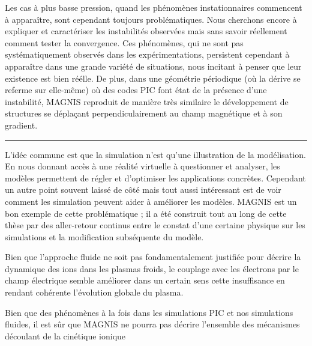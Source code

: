 Les cas à plus basse pression, quand les phénomènes instationnaires
commencent à apparaître, sont cependant toujours problématiques. Nous
cherchons encore à expliquer et caractériser les instabilités observées mais
sans savoir réellement comment tester la convergence. Ces phénomènes, qui ne
sont pas systématiquement observés dans les expérimentations, 
persistent cependant à apparaître dans une grande variété de situations, nous
incitant à penser que leur existence est bien réélle. De plus, dans une
géométrie périodique (où la dérive se referme sur elle-même) où des codes PIC
font état de la présence d'une instabilité, MAGNIS reproduit de manière très similaire 
le développement de structures se déplaçant perpendiculairement au champ
magnétique et à son gradient.

\begin{center}
\rule{0.6\textwidth}{1pt}
\end{center}

L'idée commune est que la simulation n'est qu'une illustration de la
modélisation. En nous donnant accès à une réalité virtuelle à questionner et
analyser, les modèles permettent de régler et d'optimiser les applications
concrètes. Cependant un autre point souvent laissé de côté mais tout aussi
intéressant est de voir comment les simulation peuvent aider à améliorer les
modèles. MAGNIS est un bon exemple de cette problématique ; il a été construit
tout au long de cette thèse par des aller-retour continus entre le constat d'une
certaine physique sur les simulations et la modification subséquente du modèle.


Bien que
l'approche fluide ne soit pas fondamentalement justifiée pour décrire la
dynamique des ions dans les plasmas froids, le couplage avec les électrons par
le champ électrique semble améliorer dans un certain sens cette insuffisance en
rendant cohérente l'évolution globale du plasma.

Bien que des phénomènes à la fois dans les
simulations PIC et nos simulations fluides, il est sûr que MAGNIS ne
pourra pas décrire l'ensemble des mécanismes découlant de la cinétique ionique

